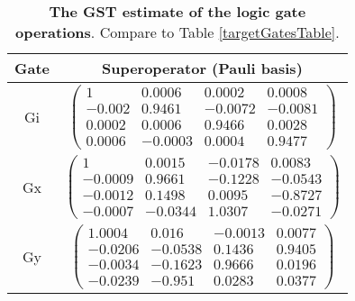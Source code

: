 \documentclass{article}[11pt]
\begin{document}
\begin{table}[h]
\begin{center}
\begin{tabular}[l]{|c|c|}
\hline
Gate & Superoperator (Pauli basis) \\ \hline
Gi & $ \left(\!\!\begin{array}{cccc}
1 & 0.0006 & 0.0002 & 0.0008 \\ 
-0.002 & 0.9461 & -0.0072 & -0.0081 \\ 
0.0002 & 0.0006 & 0.9466 & 0.0028 \\ 
0.0006 & -0.0003 & 0.0004 & 0.9477
 \end{array}\!\!\right) $
 \\ \hline
Gx & $ \left(\!\!\begin{array}{cccc}
1 & 0.0015 & -0.0178 & 0.0083 \\ 
-0.0009 & 0.9661 & -0.1228 & -0.0543 \\ 
-0.0012 & 0.1498 & 0.0095 & -0.8727 \\ 
-0.0007 & -0.0344 & 1.0307 & -0.0271
 \end{array}\!\!\right) $
 \\ \hline
Gy & $ \left(\!\!\begin{array}{cccc}
1.0004 & 0.016 & -0.0013 & 0.0077 \\ 
-0.0206 & -0.0538 & 0.1436 & 0.9405 \\ 
-0.0034 & -0.1623 & 0.9666 & 0.0196 \\ 
-0.0239 & -0.951 & 0.0283 & 0.0377
 \end{array}\!\!\right) $
 \\ \hline
\end{tabular}

\caption{\textbf{The GST estimate of the logic gate operations}.  Compare to Table \ref{targetGatesTable}.\label{bestGatesetGatesTable}}
\end{center}
\end{table}
\end{document}
